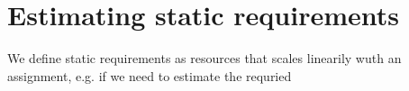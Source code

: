 \section{Estimating static requirements}
We define static requirements as resources that scales linearily wuth
an assignment, e.g. if we need to estimate the requried




